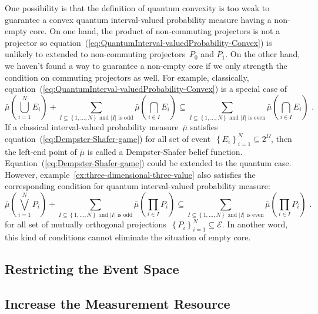 \documentclass[12pt]{iopart}
\theoremstyle{remark}
\newcommand{\events}{\ensuremath{\mathcal{E}}}
\begin{document}
One possibility is that the definition of quantum convexity is too
weak to guarantee a convex quantum interval-valued probability measure
having a non-empty core. On one hand, the product of non-commuting
projectors is not a projector so equation~(\ref{eq:QuantumInterval-valuedProbability-Convex})
is unlikely to extended to non-commuting projectors~$P_{0}$ and
$P_{1}$. On the other hand, we haven't found a way to guarantee a
non-empty core if we only strength the condition on commuting projectors
as well. For example, classically, equation~(\ref{eq:QuantumInterval-valuedProbability-Convex})
is a special case of 
\begin{equation}
\bar{\mu}\left(\bigcup_{i=1}^{N}E_{i}\right)+\sum_{I\subseteq\left\{ 1,\ldots,N\right\} \textrm{ and }\left|I\right|\textrm{ is odd}}\bar{\mu}\left(\bigcap_{i\in I}E_{i}\right)\subseteq\sum_{I\subseteq\left\{ 1,\ldots,N\right\} \textrm{ and }\left|I\right|\textrm{ is even}}\bar{\mu}\left(\bigcap_{i\in I}E_{i}\right)\textrm{ .}\label{eq:Dempster-Shafer-game}
\end{equation}
If a classical interval-valued probability measure~$\bar{\mu}$ satisfies
equation~(\ref{eq:Dempster-Shafer-game}) for all set of event~$\left\{ E_{i}\right\} _{i=1}^{N}\subseteq2^{\Omega}$,
then the left-end point of $\bar{\mu}$ is called a Dempster-Shafer
belief function. Equation~(\ref{eq:Dempster-Shafer-game}) could
be extended to the quantum case. However, example~\ref{ex:three-dimensional-three-value}
also satisfies the corresponding condition for quantum interval-valued
probability measure: 
\begin{equation}
\bar{\mu}\left(\bigvee_{i=1}^{N}P_{i}\right)+\sum_{I\subseteq\left\{ 1,\ldots,N\right\} \textrm{ and }\left|I\right|\textrm{ is odd}}\bar{\mu}\left(\prod_{i\in I}P_{i}\right)\subseteq\sum_{I\subseteq\left\{ 1,\ldots,N\right\} \textrm{ and }\left|I\right|\textrm{ is even}}\bar{\mu}\left(\prod_{i\in I}P_{i}\right)\textrm{ .}\label{eq:Dempster-Shafer-game-quantum}
\end{equation}
for all set of mutually orthogonal projections~$\left\{ P_{i}\right\} _{i=1}^{N}\subseteq\events$.
In another word, this kind of conditions cannot eliminate the situation
of empty core.

\subsection{Restricting the Event Space}

\subsection{Increase the Measurement Resource}
\end{document}
